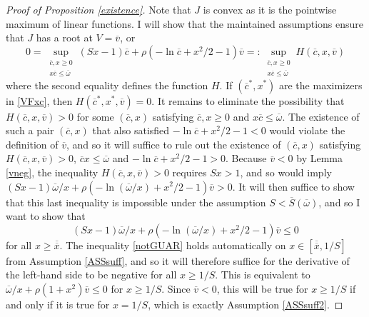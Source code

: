 \documentclass[11pt]{article}
\theoremstyle{plain}
\theoremstyle{definition} %
\begin{document}
\begin{proof}[Proof of Proposition \ref{existence}]
Note that $J$ is convex as it is the pointwise maximum of linear functions. I will show that the maintained assumptions ensure that $J$ has a root at $V = \overline{v}$, or 
$$
0 = \sup_{\substack{\overline{c},x\geq 0 \\ x\overline{c} \leq \overline{\omega}}} (Sx - 1)\overline{c} + \rho(-\ln\overline{c} + x^2/2 - 1)\overline{v} =: \sup_{\substack{\overline{c},x\geq 0 \\ x\overline{c} \leq \overline{\omega}}} H(\overline{c}, x, \overline{v})
$$
where the second equality defines the function $H$. If $(\overline{c}^*, x^*)$ are the maximizers in \eqref{VFxc}, then $H(\overline{c}^*, x^*, \overline{v}) = 0$. It remains to eliminate the possibility that $H(\overline{c}, x, \overline{v}) > 0$ for some $(\overline{c}, x)$ satisfying $\overline{c},x\geq 0$ and $x\overline{c} \leq \overline{\omega}$. The existence of such a pair $(\overline{c}, x)$ that also satisfied $- \ln \overline{c} + x^2/2 - 1 < 0$ would violate the definition of $\overline{v}$, and so it will suffice to rule out the existence of $(\overline{c}, x)$ satisfying $H(\overline{c}, x, \overline{v}) > 0$, $\overline{c}x \leq \overline{\omega}$ and $- \ln \overline{c} + x^2/2 - 1 > 0$. Because $\overline{v} < 0$ by Lemma \ref{vneg}, the inequality $H(\overline{c}, x, \overline{v}) > 0$ requires $Sx > 1$, and so would imply $(Sx - 1)\overline{\omega}/x + \rho(-\ln(\overline{\omega}/x) + x^2/2 - 1)\overline{v} > 0$. It will then suffice to show that this last inequality is impossible under the assumption $S < \overline{S}(\overline{\omega})$, and so I want to show that
\begin{equation}
(Sx - 1)\overline{\omega}/x + \rho(-\ln(\overline{\omega}/x) + x^2/2 - 1)\overline{v} \leq 0
\label{notGUAR}
\end{equation}
for all $x \geq \overline{\overline{x}}$. The inequality \eqref{notGUAR} holds automatically on $x \in [\overline{\overline{x}}, 1/S]$ from Assumption \ref{ASSsuff}, and so it will therefore suffice for the derivative of the left-hand side to be negative for all $x \geq 1/S$. This is equivalent to $\overline{\omega}/x + \rho(1 + x^2)\overline{v} \leq 0$ for $x \geq 1/S$. Since $\overline{v}<0$, this will be true for $x \geq 1/S$ if and only if it is true for $x = 1/S$, which is exactly Assumption \ref{ASSsuff2}. 


\end{proof}
\end{document}
